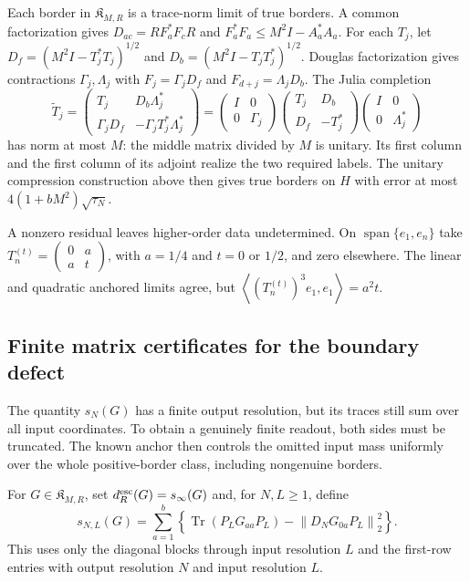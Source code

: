 \documentclass[11pt,a4paper]{amsart}
\numberwithin{equation}{section}
\theoremstyle{definition}
\theoremstyle{remark}
\DeclareMathOperator{\Tr}{Tr}
\DeclareMathOperator{\Span}{span}
\newcommand{\norm}[1]{\left\lVert#1\right\rVert}
\newcommand{\ip}[2]{\left\langle#1,#2\right\rangle}
\begin{document}
Each border in $\mathfrak K_{M,R}$ is a trace-norm limit of true borders. A common factorization gives
$D_{ac}=RF_a^*F_cR$ and $F_a^*F_a\le M^2I-A_a^*A_a$.
For each $T_j$, let $D_f=(M^2I-T_j^*T_j)^{1/2}$ and $D_b=(M^2I-T_jT_j^*)^{1/2}$. Douglas factorization gives contractions $\Gamma_j,\Lambda_j$ with
$F_j=\Gamma_jD_f$ and $F_{d+j}=\Lambda_jD_b$.
The Julia completion \cite{Robinson}
\begin{equation}\label{eq:julia}
 \widetilde T_j=
 \begin{pmatrix}T_j&D_b\Lambda_j^*\\\Gamma_jD_f&-\Gamma_jT_j^*\Lambda_j^*\end{pmatrix}
 =\begin{pmatrix}I&0\\0&\Gamma_j\end{pmatrix}
 \begin{pmatrix}T_j&D_b\\D_f&-T_j^*\end{pmatrix}
 \begin{pmatrix}I&0\\0&\Lambda_j^*\end{pmatrix}
\end{equation}
has norm at most $M$: the middle matrix divided by $M$ is unitary. Its first column and the first column of its adjoint realize the two required labels. The unitary compression construction above then gives true borders on $H$ with error at most $4(1+bM^2)\sqrt{\tau_N}$.

A nonzero residual leaves higher-order data undetermined. On $\Span\{e_1,e_n\}$ take
$T_n^{(t)}=\left(\begin{smallmatrix}0&a\\a&t\end{smallmatrix}\right)$,
with $a=1/4$ and $t=0$ or $1/2$, and zero elsewhere. The linear and quadratic anchored limits agree, but
$\ip{(T_n^{(t)})^3e_1}{e_1}=a^2t$.

\subsection{Finite matrix certificates for the boundary defect}
The quantity $s_N(G)$ has a finite output resolution, but its traces still sum over all input coordinates. To obtain a genuinely finite readout, both sides must be truncated. The known anchor then controls the omitted input mass uniformly over the whole positive-border class, including nongenuine borders.

For $G\in\mathfrak K_{M,R}$, set $d_R^{\rm esc}(G)=s_\infty(G)$ and, for $N,L\ge1$, define
\begin{equation}\label{eq:finite_border_residual}
 s_{N,L}(G)=\sum_{a=1}^b
 \left\{\Tr(P_LG_{aa}P_L)-\norm{D_NG_{0a}P_L}_2^2\right\}.
\end{equation}
This uses only the diagonal blocks through input resolution $L$ and the first-row entries with output resolution $N$ and input resolution $L$.
\end{document}
